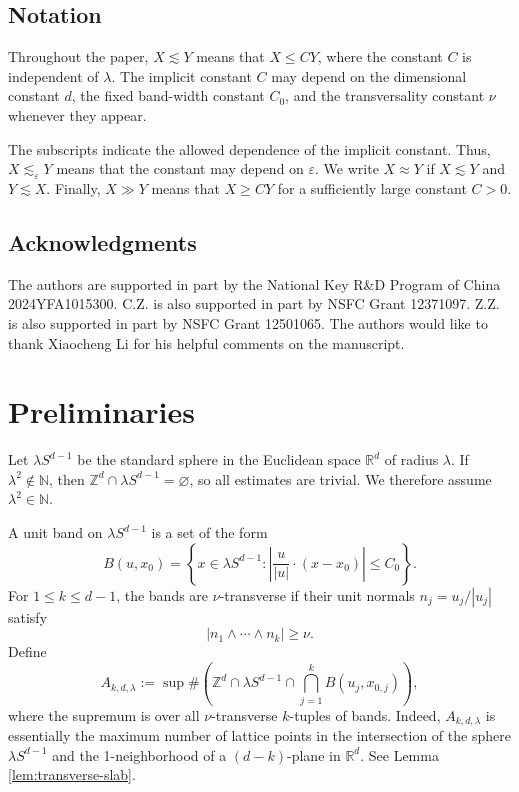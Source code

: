 \documentclass[11pt,reqno]{amsart}
\numberwithin{equation}{section}
\newcommand{\1}{\textbf{1}}
\newcommand{\R}{\mathbb R}
\newcommand{\Z}{\mathbb Z}
\newcommand{\N}{\mathbb N}
\newcommand{\eps}{\varepsilon}
\newcommand{\la}{\lambda}
\begin{document}
	\subsection{Notation}
	
	Throughout the paper, \(X\lesssim Y\) means that \(X\le CY\), where the
	constant \(C\) is independent of \(\lambda\). The implicit constant \(C\) may depend on the dimensional constant \(d\), the fixed band-width
	constant \(C_0\), and the transversality constant \(\nu\) whenever they appear. 
	
	The subscripts indicate the allowed
	dependence of the implicit constant. Thus, \(X\lesssim_\eps Y\) means that the
	constant may depend on \(\eps\).  We write \(X\approx Y\) if
	\(X\lesssim Y\) and \(Y\lesssim X\).  Finally, \(X\gg Y\) means that
	\(X\ge CY\) for a sufficiently large constant \(C>0\).
	
	\subsection{Acknowledgments}
	
	The authors are supported in part by the National Key R\&D Program of China
	2024YFA1015300.  C.Z. is also supported in part by NSFC Grant 12371097.
	Z.Z. is also supported in part by NSFC Grant 12501065. The authors would like to thank Xiaocheng Li for his helpful comments on the manuscript.
	
	\section{Preliminaries}\label{sec2}
	Let $\lambda S^{d-1}$ be the standard sphere in the Euclidean space $\R^d$ of radius $\lambda$. If \(\la^2\notin\N\), then
	\(\Z^d\cap\la S^{d-1}=\varnothing\), so all estimates are trivial.  We
	therefore assume \(\la^2\in\N\).
	
	A unit band on \(\la S^{d-1}\) is a set of the form
	\[
	B(u,x_0)=\left\{x\in\la S^{d-1}:
	\left|\frac{u}{|u|}\cdot(x-x_0)\right|\le C_0\right\}.
	\]
	For \(1\le k\le d-1\), the bands are \(\nu\)-transverse if their unit
	normals \(n_j=u_j/|u_j|\) satisfy
	\[
	|n_1\wedge\cdots\wedge n_k|\ge\nu.
	\]
	Define
	\[
	A_{k,d,\la}:=\sup\#\left(\Z^d\cap\la S^{d-1}\cap
	\bigcap_{j=1}^k B(u_j,x_{0,j})\right),
	\]
	where the supremum is over all \(\nu\)-transverse \(k\)-tuples of bands. Indeed, $A_{k,d,\la}$ is essentially the maximum number of lattice points in the intersection of the sphere $\la S^{d-1}$ and the 1-neighborhood of a $(d-k)$-plane in $\mathbb{R}^d$. See Lemma \ref{lem:transverse-slab}.
	
\end{document}
